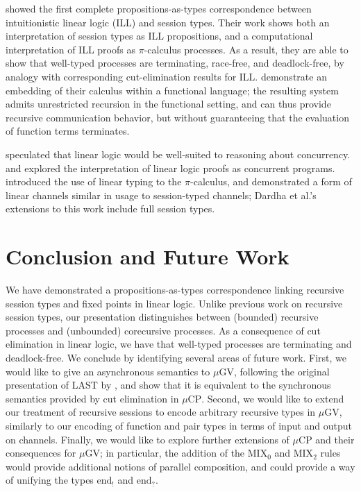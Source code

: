\documentclass[orivec,envcountsame]{llncs}
\newcommand{\outterm}{\mathrm{end}_!}
\newcommand{\interm}{\mathrm{end}_?}
\newcommand{\mucp}{$\mu\mathrm{CP}$\xspace}
\newcommand{\mugv}{$\mu\mathrm{GV}$\xspace}
\begin{document}
\citet{CairesPfenning10} showed the first complete propositions-as-types correspondence between
intuitionistic linear logic (ILL) and session types.  Their work shows both an interpretation of
session types as ILL propositions, and a computational interpretation of ILL proofs as
$\pi$-calculus processes.  As a result, they are able to show that well-typed processes are
terminating, race-free, and deadlock-free, by analogy with corresponding cut-elimination results for
ILL.  \citet{Toninho13} demonstrate an embedding of their calculus within a functional language; the
resulting system admits unrestricted recursion in the functional setting, and can thus provide
recursive communication behavior, but without guaranteeing that the evaluation of function terms
terminates.

\citet{Girard87} speculated that linear logic would be well-suited to reasoning about concurrency.
\citet{Abramsky92} and \citet{BellinScott94} explored the interpretation of linear logic proofs as
concurrent programs.  \citet{Kobayashi96} introduced the use of linear typing to the $\pi$-calculus,
and demonstrated a form of linear channels similar in usage to session-typed channels;
Dardha et al.'s~\citeyearpar{Dardha12} extensions to this work include full session types.

\section{Conclusion and Future Work}\label{sec:future}

We have demonstrated a propositions-as-types correspondence linking recursive session types and
fixed points in linear logic.  Unlike previous work on recursive session types, our presentation
distinguishes between (bounded) recursive processes and (unbounded) corecursive processes.  As a
consequence of cut elimination in linear logic, we have that well-typed processes are terminating
and deadlock-free.  We conclude by identifying several areas of future work.  First, we would like
to give an asynchronous semantics to \mugv, following the original presentation of LAST by
\citet{GayVasconcelos10}, and show that it is equivalent to the synchronous semantics provided by
cut elimination in \mucp.  Second, we would like to extend our treatment of recursive sessions to
encode arbitrary recursive types in \mugv, similarly to our encoding of function and pair types in
terms of input and output on channels.  Finally, we would like to explore further extensions of
\mucp and their consequences for \mugv; in particular, the addition of the MIX$_0$ and MIX$_2$ rules
would provide additional notions of parallel composition, and could provide a way of unifying the
types $\outterm$ and $\interm$.
\end{document}
